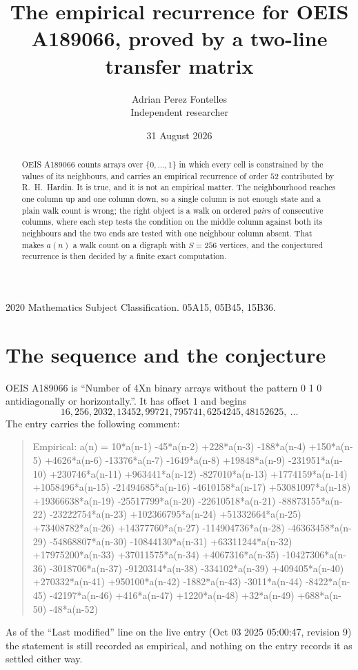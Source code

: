 \documentclass[11pt,a4paper]{article}
\title{The empirical recurrence for OEIS A189066, proved by a two-line transfer matrix}
\author{Adrian Perez Fontelles\\ \small Independent researcher}
\date{31 August 2026}
\theoremstyle{plain}
\theoremstyle{definition}
\begin{document}
\maketitle

\begin{abstract}
OEIS A189066 counts arrays over $\{0,\dots,1\}$ in which every cell is constrained by the
values of its neighbours, and carries an empirical recurrence of order $52$ contributed
by R.~H.~Hardin. It is true, and it is not an empirical matter. The neighbourhood reaches one
column up and one column down, so a single column is not enough state and a plain walk count
is wrong; the right object is a walk on ordered \emph{pairs} of consecutive columns, where
each step tests the condition on the middle column against both its neighbours and the two
ends are tested with one neighbour column absent. That makes $a(n)$ a walk count on a digraph
with $S=256$ vertices, and the conjectured recurrence is then decided by a finite exact
computation.
\end{abstract}

\noindent\small 2020 Mathematics Subject Classification. 05A15, 05B45, 15B36.\normalsize

\section{The sequence and the conjecture}

OEIS A189066 is ``Number of 4Xn binary arrays without the pattern 0 1 0 antidiagonally or horizontally.''. It has offset $1$ and begins
\[
16, 256, 2032, 13452, 99721, 795741, 6254245, 48152625,\ \dots
\]
The entry carries the following comment:
\begin{quote}\small
Empirical: a(n) = 10*a(n-1) -45*a(n-2) +228*a(n-3) -188*a(n-4) +150*a(n-5) +4626*a(n-6) -13376*a(n-7) -1649*a(n-8) +19848*a(n-9) -231951*a(n-10) +230746*a(n-11) +963441*a(n-12) -827010*a(n-13) +1774159*a(n-14) +1058496*a(n-15) -21494685*a(n-16) -4610158*a(n-17) +53081097*a(n-18) +19366638*a(n-19) -25517799*a(n-20) -22610518*a(n-21) -88873155*a(n-22) -23222754*a(n-23) +102366795*a(n-24) +51332664*a(n-25) +73408782*a(n-26) +14377760*a(n-27) -114904736*a(n-28) -46363458*a(n-29) -54868807*a(n-30) -10844130*a(n-31) +63311244*a(n-32) +17975200*a(n-33) +37011575*a(n-34) +4067316*a(n-35) -10427306*a(n-36) -3018706*a(n-37) -9120314*a(n-38) -334102*a(n-39) +409405*a(n-40) +270332*a(n-41) +950100*a(n-42) -1882*a(n-43) -3011*a(n-44) -8422*a(n-45) -42197*a(n-46) +416*a(n-47) +1220*a(n-48) +32*a(n-49) +688*a(n-50) -48*a(n-52)
\end{quote}
As of the ``Last modified'' line on the live entry (Oct 03 2025 05:00:47, revision 9) the statement is
still recorded as empirical, and nothing on the entry records it as settled either way.
\end{document}
